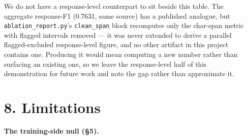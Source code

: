 \documentclass[11pt]{article}
\begin{document}
We do not have a response-level counterpart to sit beside this table. The aggregate
response-F1 (0.7631, same source) has a published analogue, but \texttt{ablation\_report.py}'s
\texttt{clean\_span} block recomputes only the char-span metric with flagged intervals removed --- it
was never extended to derive a parallel flagged-excluded response-level figure, and no other
artifact in this project contains one. Producing it would mean computing a new number rather
than surfacing an existing one, so we leave the response-level half of this demonstration for
future work and note the gap rather than approximate it.

\section{8. Limitations}\label{limitations}

\textbf{The training-side null (§5).}
\end{document}

